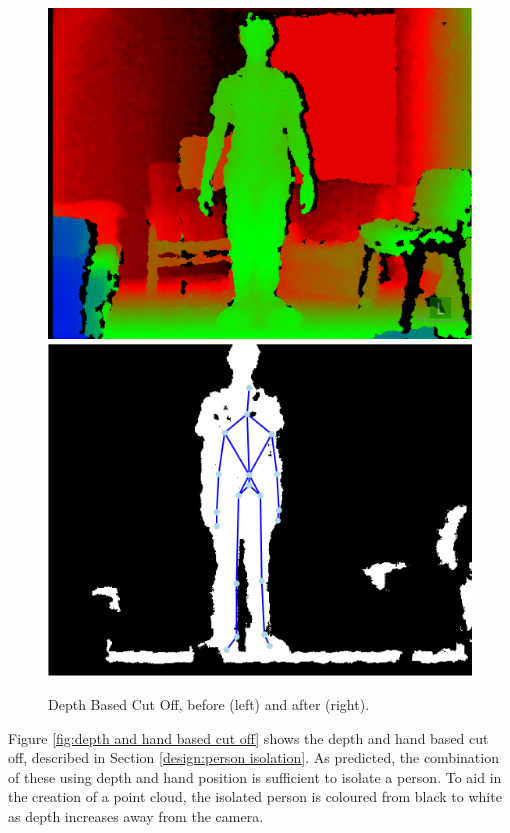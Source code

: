 \begin{figure}[h]
\begin{center}
\includegraphics[scale=0.4]{./testing/parse1} 
\includegraphics[scale=0.4]{./testing/parse2}
\end{center}
\caption{Depth Based Cut Off, before (left) and after (right).}
\label{fig:depth based cut off}
\end{figure} 

Figure \ref{fig:depth and hand based cut off} shows the depth and hand based cut off, described in Section \ref{design:person isolation}. As predicted, the combination of these using depth and hand position is sufficient to isolate a person. To aid in the creation of a point cloud, the isolated person is coloured from black to white as depth increases away from the camera.\\


